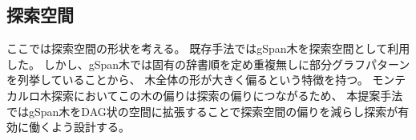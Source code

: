 \documentclass[a4paper,10.5pt]{jsarticle}           %
\begin{document}
\subsection{探索空間}
ここでは探索空間の形状を考える。
既存手法ではgSpan木を探索空間として利用した。
しかし、gSpan木では固有の辞書順を定め重複無しに部分グラフパターンを列挙していることから、
木全体の形が大きく偏るという特徴を持つ。
モンテカルロ木探索においてこの木の偏りは探索の偏りにつながるため、
本提案手法ではgSpan木をDAG状の空間に拡張することで探索空間の偏りを減らし探索が有効に働くよう設計する。

\end{document}
